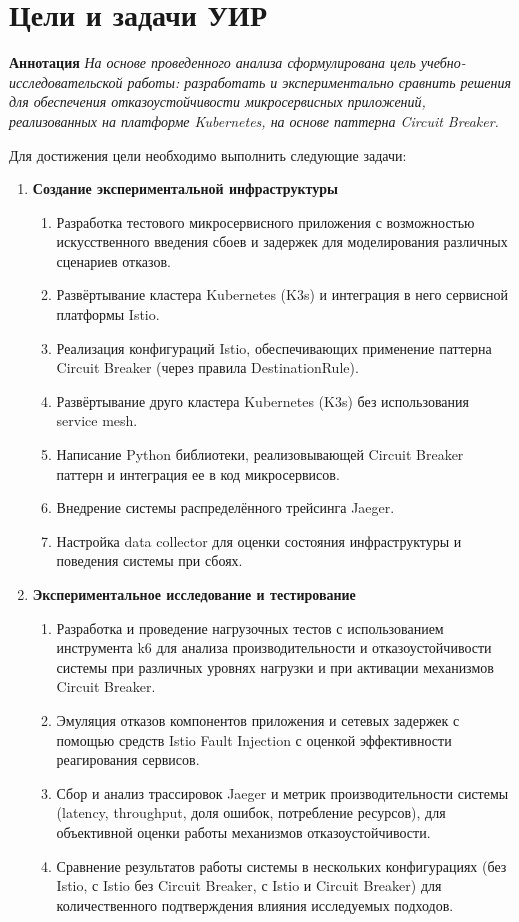 \section{Цели и задачи УИР}

\textbf{Аннотация} \textit{На основе проведенного анализа сформулирована цель учебно-исследовательской работы: разработать и экспериментально сравнить решения для обеспечения отказоустойчивости микросервисных приложений, реализованных на платформе Kubernetes, на основе паттерна Circuit Breaker.} 


Для достижения цели необходимо выполнить следующие задачи:
    \begin{enumerate}    
      \item \textbf{Создание экспериментальной инфраструктуры}
      \begin{enumerate}
        \item Разработка тестового микросервисного приложения с возможностью искусственного введения сбоев и задержек для моделирования различных сценариев отказов.
        \item Развёртывание кластера Kubernetes (K3s) и интеграция в него сервисной платформы Istio.
        \item Реализация конфигураций Istio, обеспечивающих применение паттерна Circuit Breaker (через правила DestinationRule).
        \item Развёртывание друго кластера Kubernetes (K3s) без использования service mesh.
        \item Написание Python библиотеки, реализовывающей Circuit Breaker паттерн и интеграция ее в код микросервисов.
        \item Внедрение системы распределённого трейсинга Jaeger.
        \item Настройка data collector для оценки состояния инфраструктуры и поведения системы при сбоях.
      \end{enumerate}
    
      \item \textbf{Экспериментальное исследование и тестирование}
      \begin{enumerate}
        \item Разработка и проведение нагрузочных тестов с использованием инструмента k6 для анализа производительности и отказоустойчивости системы при различных уровнях нагрузки и при активации механизмов Circuit Breaker.
        \item Эмуляция отказов компонентов приложения и сетевых задержек с помощью средств Istio Fault Injection с оценкой эффективности реагирования сервисов.
        \item Сбор и анализ трассировок Jaeger и метрик производительности системы (latency, throughput, доля ошибок, потребление ресурсов), для объективной оценки работы механизмов отказоустойчивости.
        \item Сравнение результатов работы системы в нескольких конфигурациях (без Istio, с Istio без Circuit Breaker, с Istio и Circuit Breaker) для количественного подтверждения влияния исследуемых подходов.
      \end{enumerate}
    

\end{enumerate}
